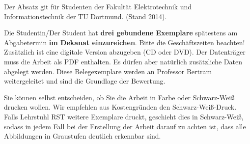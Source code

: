Der Absatz git für Studenten der Fakultät Elektrotechnik und Informationstechnik der TU Dortmund. (Stand 2014).

Die Studentin/Der Student hat \textbf{drei gebundene Exemplare} spätestens am Abgabetermin \textbf{im Dekanat einzureichen}. Bitte die Geschäftszeiten beachten! Zusätzlich ist eine digitale Version abzugeben (CD oder DVD). Der Datenträger muss die Arbeit als PDF enthalten. Es dürfen aber natürlich zusätzliche Daten abgelegt werden.
Diese Belegexemplare werden an Professor Bertram weitergeleitet und sind die Grundlage der Bewertung.

Sie können selbst entscheiden, ob Sie die Arbeit in Farbe oder Schwarz-Weiß drucken wollen. Wir empfehlen aus Kostengründen den Schwarz-Weiß-Druck. Falls Lehrstuhl RST weitere Exemplare druckt, geschieht dies in Schwarz-Weiß, sodass in jedem Fall bei der Erstellung der Arbeit darauf zu achten ist, dass alle Abbildungen in Graustufen deutlich erkennbar sind.\\









